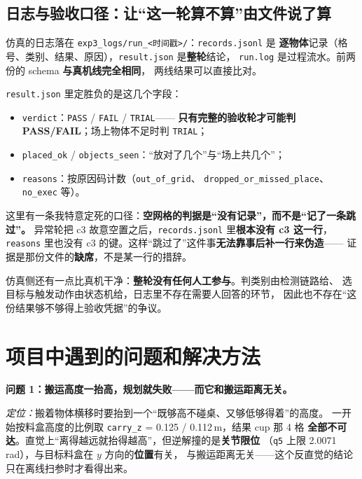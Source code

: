 \documentclass[12pt,a4paper]{ctexart}
\begin{document}
\subsection{日志与验收口径：让“这一轮算不算”由文件说了算}

仿真的日志落在 \texttt{exp3\_logs/run\_<时间戳>/}：\texttt{records.jsonl} 是
\textbf{逐物体}记录（格号、类别、结果、原因），\texttt{result.json} 是\textbf{整轮}结论，
\texttt{run.log} 是过程流水。前两份的 schema \textbf{与真机线完全相同}，
两线结果可以直接比对。

\texttt{result.json} 里定胜负的是这几个字段：

\begin{itemize}[leftmargin=1.6em]
  \item \texttt{verdict}：\texttt{PASS} / \texttt{FAIL} / \texttt{TRIAL}——
        \textbf{只有完整的验收轮才可能判 PASS/FAIL}；场上物体不足时判 \texttt{TRIAL}；
  \item \texttt{placed\_ok} / \texttt{objects\_seen}：“放对了几个”与“场上共几个”；
  \item \texttt{reasons}：按原因码计数（\texttt{out\_of\_grid}、
        \texttt{dropped\_or\_missed\_place}、\texttt{no\_exec} 等）。
\end{itemize}

这里有一条我特意定死的口径：\textbf{空网格的判据是“没有记录”，而不是“记了一条跳过”。}
异常轮把 c3 故意空置之后，\texttt{records.jsonl} 里\textbf{根本没有 c3 这一行}，
\texttt{reasons} 里也没有 c3 的键。这样“跳过了”这件事\textbf{无法靠事后补一行来伪造}——
证据是那份文件的\textbf{缺席}，不是某一行的措辞。

仿真侧还有一点比真机干净：\textbf{整轮没有任何人工参与}。判类别由检测链路给、
选目标与触发动作由状态机给，日志里不存在需要人回答的环节，
因此也不存在“这份结果够不够得上验收凭据”的争议。

\section{项目中遇到的问题和解决方法}

\textbf{问题 1：搬运高度一抬高，规划就失败——而它和搬运距离无关。}

\textit{定位：}搬着物体横移时要抬到一个“既够高不碰桌、又够低够得着”的高度。
一开始按料盒高度的比例取 \texttt{carry\_z} = 0.125 / 0.112\,m，结果 cup 那 4 格
\textbf{全部不可达}。直觉上“离得越远就抬得越高”，但逆解撞的是\textbf{关节限位}
（\texttt{q5} 上限 2.0071\,rad），与目标料盒在 $y$ 方向的\textbf{位置}有关，
与搬运距离无关——这个反直觉的结论只在离线扫参时才看得出来。
\end{document}
